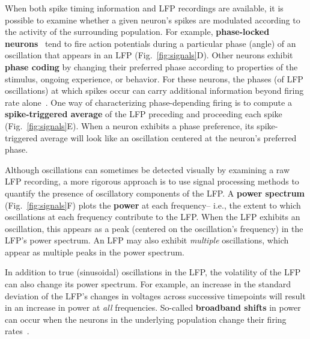 \documentclass{llmxive}
\begin{document}
When both spike timing information and LFP recordings are available,
it is possible to examine whether a given neuron's spikes are
modulated according to the activity of the surrounding population.
For example, \textbf{phase-locked neurons}~\citep{JacoEtal07} tend to
fire action potentials during a particular phase (angle) of an
oscillation that appears in an LFP (Fig.~\ref{fig:signals}D).  Other
neurons exhibit \textbf{phase coding} by changing their preferred
phase according to properties of the stimulus, ongoing experience, or
behavior.  For these neurons, the phases (of LFP oscillations) at
which spikes occur can carry additional information beyond firing rate
alone~\citep{SkagEtal96, HuxtEtal08, KamoEtal98, Lism05}.  One way of
characterizing phase-depending firing is to compute a
\textbf{spike-triggered average} of the LFP preceding and proceeding
each spike (Fig.~\ref{fig:signals}E).  When a neuron exhibits a phase
preference, its spike-triggered average will look like an oscillation
centered at the neuron's preferred phase.

Although oscillations can sometimes be detected visually by examining
a raw LFP recording, a more rigorous approach is to use signal
processing methods to quantify the presence of oscillatory components
of the LFP.  A \textbf{power spectrum} (Fig.~\ref{fig:signals}F) plots
the \textbf{power} at each frequency-- i.e., the extent to which
oscillations at each frequency contribute to the LFP.  When the LFP
exhibits an oscillation, this appears as a peak (centered on the
oscillation's frequency) in the LFP's power spectrum.  An LFP may also
exhibit \textit{multiple} oscillations, which appear as multiple peaks
in the power spectrum.

In addition to true (sinusoidal) oscillations in the LFP, the
volatility of the LFP can also change its power spectrum.  For
example, an increase in the standard deviation of the LFP's changes in
voltages across successive timepoints will result in an increase in
power at \textit{all} frequencies.  So-called \textbf{broadband
  shifts} in power can occur when the neurons in the underlying
population change their firing rates~\citep{MannEtal09a}.
\end{document}
